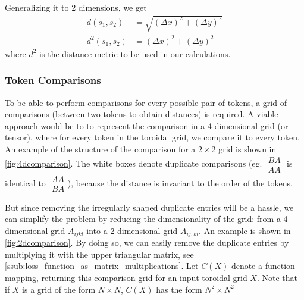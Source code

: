 Generalizing it to 2 dimensions, we get
\begin{align*}
    d(s_1,s_2)&=\sqrt{(\Delta x)^2+(\Delta y)^2} \\
    d^2(s_1,s_2)&=(\Delta x)^2+(\Delta y)^2
\end{align*}
where $d^2$ is the distance metric to be used in our calculations.

\subsubsection{Token Comparisons}%
\label{ssub:token_comparisons}
To be able to perform comparisons for every possible pair of tokens, a grid of comparisons (between two tokens to obtain distances) is required. A viable approach would be to to represent the comparison in a 4-dimensional grid (or tensor), where for every token in the toroidal grid, we compare it to every token. An example of the structure of the comparison for a $2\times 2$ grid is shown in \autoref{fig:4dcomparison}. The white boxes denote duplicate comparisons (eg. $
\begin{smallmatrix}
    BA\\ AA
\end{smallmatrix}
$ is identical to
$
\begin{smallmatrix}
    AA\\ BA
\end{smallmatrix}
$), because the distance is invariant to the order of the tokens.


But since removing the irregularly shaped duplicate entries will be a hassle, we can simplify the problem by reducing the dimensionality of the grid: from a 4-dimensional grid $A_{ijkl}$ into a 2-dimensional grid $A_{ij,kl}$. An example is shown in \autoref{fig:2dcomparison}. By doing so, we can easily remove the duplicate entries by multiplying it with the upper triangular matrix, see \autoref{ssub:loss_function_as_matrix_multiplications}. Let $C(X)$ denote a function mapping, returning this comparison grid for an input toroidal grid $X$. Note that if $X$ is a grid of the form $N\times N$, $C(X)$ has the form $N^2\times N^2$

